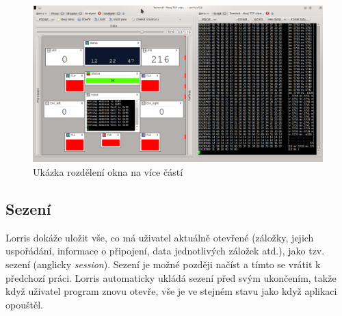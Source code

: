 \documentclass[12pt, a4paper, oneside]{article}
\newcommand{\It}{\textit}  %
\begin{document}
\begin{figure}[H]
\begin{center}
\includegraphics[width=\textwidth]{img/split.png}
\caption{Ukázka rozdělení okna na více částí}
\label{split_img}
\end{center}
\end{figure}

\subsection{Sezení}
Lorris dokáže uložit vše, co má uživatel aktuálně otevřené (záložky, jejich uspořádání, informace o připojení, data jednotlivých záložek atd.), jako tzv. sezení (anglicky \It{session}). Sezení je možné později načíst a tímto se vrátit k předchozí práci. Lorris automaticky ukládá sezení před svým ukončením, takže když uživatel program znovu otevře, vše je ve stejném stavu jako když aplikaci opouštěl.
\end{document}
